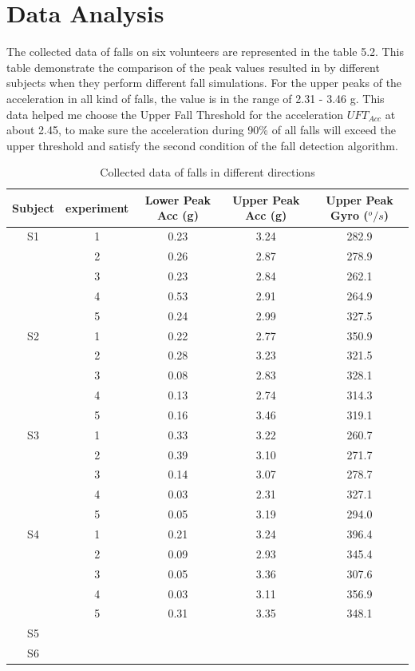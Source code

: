 \documentclass[letterpaper,12pt,titlepage,oneside,final]{book}
\begin{document}
\section{Data Analysis}
The collected data of falls on six volunteers are represented in the table 5.2. This table demonstrate the comparison of the peak values resulted in by different subjects when they perform different fall simulations. 
For the upper peaks of the acceleration in all kind of falls, the value is in the range of 2.31 - 3.46 g. This data helped me choose the Upper Fall Threshold for the acceleration $UFT_{Acc}$ at about 2.45, to make sure the acceleration during 90\% of all falls will exceed the upper threshold and satisfy the second condition of the fall detection algorithm. 
\begin{table}[h]
	\begin{center}
		\begin{tabular}{ |c|c|c|c|c| } 
			\hline
			Subject & experiment & Lower Peak Acc (g) & Upper Peak Acc (g)  & Upper Peak Gyro ($^{o}/s$)\\
			\hline
			S1 & 1 & 0.23 & 3.24 & 282.9\\%
			& 2 & 0.26 & 2.87 & 278.9 \\
			& 3 & 0.23 & 2.84 & 262.1 \\
			& 4 & 0.53 &  2.91 & 264.9 \\
			& 5 & 0.24 &  2.99 & 327.5\\
			\hline
			S2 & 1 & 0.22 & 2.77 & 350.9\\
			& 2 &  0.28 &  3.23 & 321.5\\
			& 3 &  0.08 &  2.83& 328.1\\
			& 4 & 0.13 & 2.74 & 314.3\\
			& 5 & 0.16 & 3.46 & 319.1\\  %
			\hline
			S3 & 1 & 0.33 &  3.22& 260.7 \\
			& 2 &  0.39 & 3.10 & 271.7 \\
			& 3 & 0.14 & 3.07 & 278.7\\
			& 4 & 0.03 & 2.31 & 327.1\\
			& 5 & 0.05 & 3.19 & 294.0\\ %
			\hline
			S4 &1 & 0.21 & 3.24 & 396.4\\ 
			&2 &  0.09 & 2.93 & 345.4\\ 
			&3 & 0.05 & 3.36 & 307.6\\ 
			&4 & 0.03 & 3.11 & 356.9\\ 
			&5 & 0.31 & 3.35 & 348.1\\ %
			\hline
			S5 \\ %
			\hline
			S6 \\ %
			\hline
		\end{tabular}
		\caption{Collected data of falls in different directions}
		\label{table:1}
	\end{center}
\end{table}
\end{document}
